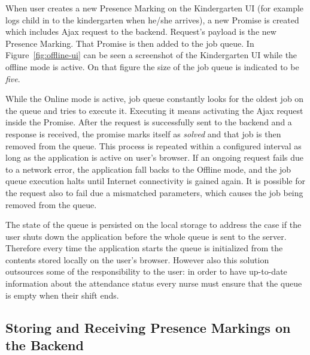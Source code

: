 When user creates a new Presence Marking on the Kindergarten UI (for example logs child in to the kindergarten when he/she arrives), a new Promise is created which includes Ajax request to the backend. Request's payload is the new Presence Marking. That Promise is then added to the job queue. In Figure~\ref{fig:offline-ui} can be seen a screenshot of the Kindergarten UI while the offline mode is active. On that figure the size of the job queue is indicated to be \textit{five}.

While the Online mode is active, job queue constantly looks for the oldest job on the queue and tries to execute it. Executing it means activating the Ajax request inside the Promise. After the request is successfully sent to the backend and a response is received, the promise marks itself as \textit{solved} and that job is then removed from the queue. This process is repeated within a configured interval as long as the application is active on user's browser. If an ongoing request fails due to a network error, the application fall backs to the Offline mode, and the job queue execution halts until Internet connectivity is gained again. It is possible for the request also to fail due a mismatched parameters, which causes the job being removed from the queue.

The state of the queue is persisted on the local storage to address the case if the user shuts down the application before the whole queue is sent to the server. Therefore every time the application starts the queue is initialized from the contents stored locally on the user's browser. However also this solution outsources some of the responsibility to the user: in order to have up-to-date information about the attendance status every nurse must ensure that the queue is empty when their shift ends.  %









\subsection{Storing and Receiving Presence Markings on the Backend}
\label{subsec:backend-implementation}

